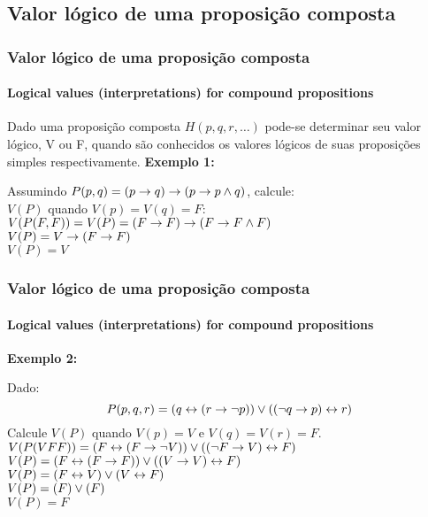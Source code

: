 \subsection{Valor lógico de uma proposição composta}
%
\begin{frame}[t]
    \frametitle{Valor lógico de uma proposição composta}
    \framesubtitle{Logical values (interpretations) for compound propositions}
    \begin{tcolorbox}[colback=red!5!white,colframe=red!75!black,title=Definição]
        \indent Dado uma proposição composta $H(p,q, r, \dots)$ pode-se determinar seu valor lógico, V ou F, quando são conhecidos os valores lógicos de suas proposições simples respectivamente.
        \tcblower
        \textbf{Exemplo 1:}
        \begin{tcolorbox}
            Assumindo $P(p,q) = (p \rightarrow q) \rightarrow (p \rightarrow p\land q)$, calcule: \\
            $V(P)$ quando $V(p)=V(q)=F$: \\ [4pt]
            $V(P(F,F))=V(P)=(F \rightarrow F) \rightarrow (F \rightarrow F\land F)$ \\
            $V(P)=V \rightarrow (F \rightarrow F)$ \\
            $V(P) = V$
        \end{tcolorbox}
    \end{tcolorbox}
\end{frame}
%
\begin{frame}[t]
    \frametitle{Valor lógico de uma proposição composta}
    \framesubtitle{Logical values (interpretations) for compound propositions}
    \begin{tcolorbox}[colback=red!5!white,colframe=red!75!black,title=Definição]
        \textbf{Exemplo 2:}
        \begin{tcolorbox}
            \vspace{-2pt}
            Dado:
            \vspace{-2pt}
            $$P(p,q,r) = (q \leftrightarrow (r \rightarrow \lnot p)) \lor ((\lnot q \rightarrow p) \leftrightarrow r)$$
            Calcule $V(P)$ quando $V(p)=V$ e $V(q)=V(r)=F$. \\ [4pt]
            $V(P(VFF)) = (F \leftrightarrow (F \rightarrow \lnot V)) \lor ((\lnot F \rightarrow V) \leftrightarrow F)$ \\
            $V(P) = (F \leftrightarrow (F \rightarrow F)) \lor ((V \rightarrow V) \leftrightarrow F)$ \\
            $V(P) = (F \leftrightarrow V) \lor (V \leftrightarrow F)$ \\
            $V(P) = (F) \lor (F)$ \\
            $V(P) = F$
        \end{tcolorbox}
    \end{tcolorbox}
\end{frame}
%
